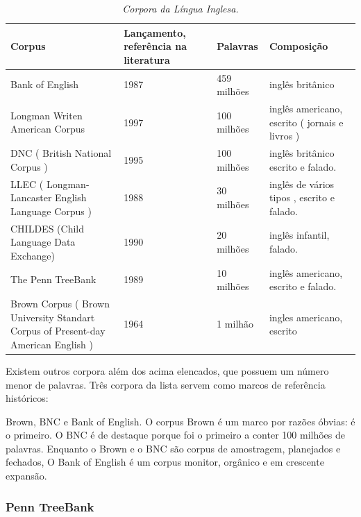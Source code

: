 \begin{table}
   \centering
   \small
   \caption{\it Corpora da Língua Inglesa.}

   \begin{tabular}{ | p{5cm} | p{3cm} | p{3cm} | p{3cm} | }
      \hline
        \textbf{Corpus} & \textbf{Lançamento, referência na literatura} & \textbf{Palavras}& \textbf{Composição}\\
        \hline
        \hline
        Bank of English & 1987 \footnotemark[1] & 459 milhões & inglês britânico\\
        \hline
        Longman Writen American Corpus & 1997 & 100 milhões  & inglês americano, escrito ( jornais e livros )\\
        \hline
        DNC ( British National Corpus ) & 1995 & 100 milhões  & inglês britânico escrito e falado.\\
        \hline
        LLEC ( Longman-Lancaster English Language Corpus ) & 1988 & 30 milhões  & inglês de vários tipos , escrito e falado.\\
        \hline
        CHILDES (Child Language Data Exchange) & 1990 & 20 milhões & inglês infantil, falado.\\
        \hline
        The Penn TreeBank & 1989 & 10 milhões & inglês americano, escrito e falado.\\
        \hline
        Brown Corpus ( Brown University Standart Corpus of Present-day American English ) & 1964 & 1 milhão  & ingles americano, escrito\\
        \hline
   \end{tabular}
   \label{tbl:corpora}
\end{table}

Existem outros corpora além dos acima elencados, que possuem um número menor de palavras. Três corpora da lista servem como marcos de referência históricos:

Brown, BNC e Bank of English. O corpus Brown é um marco por razões óbvias: é o primeiro. O BNC é de destaque porque foi o primeiro a conter 100 milhões de palavras. Enquanto o Brown e o BNC são corpus de amostragem, planejados e fechados, O Bank of English é um corpus monitor, orgânico e em crescente expansão.


\subsubsection{Penn TreeBank}
\label{sub:corpus_ingles_esquema_pen}

